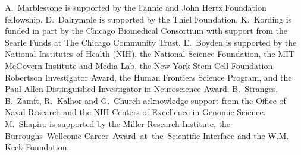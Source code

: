 A.~Marblestone is supported by the Fannie and John Hertz Foundation fellowship.
D.~Dalrymple is supported by the Thiel Foundation.
K.~Kording is funded in part by the Chicago Biomedical Consortium with support from the Searle Funds at The Chicago Community Trust.
E.~Boyden is supported by the National Institutes of Health (NIH), the National Science Foundation, the MIT
McGovern Institute and Media Lab, the New York Stem Cell Foundation Robertson Investigator
Award, the Human Frontiers Science Program, and the Paul Allen Distinguished Investigator in
Neuroscience Award.
B.~Stranges, B.~Zamft, R.~Kalhor and G.~Church acknowledge support from the Office of Naval Research and the NIH Centers of Excellence in Genomic Science.
M.~Shapiro is supported by the Miller Research Institute, the Burroughs~Wellcome Career~Award~at~the~Scientific Interface and the W.M. Keck Foundation.

\printbibliography[notsubtype=hide]


